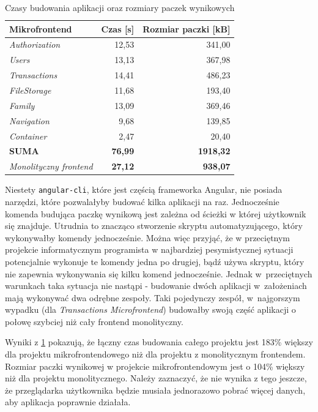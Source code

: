 \documentclass{SGGW-thesis}
\begin{document}
    \begin{table}[h]
      \centering
      \caption{Czasy budowania aplikacji oraz rozmiary paczek wynikowych}
      \begin{tabular}{|l||r|r|}
      \hline
      \textbf{Mikrofrontend} & \multicolumn{1}{l|}{\textbf{Czas {[}s{]}}} & \multicolumn{1}{l|}{\textbf{Rozmiar paczki {[}kB{]}}} \\ \hline
      \textit{Authorization} & 12,53 & 341,00 \\ \hline
      \textit{Users} & 13,13 & 367,98 \\ \hline
      \textit{Transactions} & 14,41 & 486,23 \\ \hline
      \textit{FileStorage} & 11,68 & 193,40 \\ \hline
      \textit{Family} & 13,09 & 369,46 \\ \hline
      \textit{Navigation} & 9,68 & 139,85 \\ \hline
      \textit{Container} & 2,47 & 20,40 \\ \hline
       \textbf{SUMA} & \textbf{76,99} & \textbf{1918,32} \\ \hline\hline
       \textit{Monolityczny frontend} & \textbf{27,12} & \textbf{938,07} \\ \hline
      \end{tabular}
      \label{table:build_times}
    \end{table}

    Niestety \lstinline{angular-cli}, które jest częścią frameworka Angular, nie posiada narzędzi, które pozwalałyby budować kilka aplikacji na raz. Jednocześnie komenda budująca paczkę wynikową jest zależna od ścieżki w której użytkownik się znajduje. Utrudnia to znacząco stworzenie skryptu automatyzującego, który wykonywałby komendy jednocześnie. Można więc przyjąć, że w przeciętnym projekcie informatycznym programista w najbardziej pesymistycznej sytuacji potencjalnie wykonuje te komendy jedna po drugiej, bądź używa skryptu, który nie zapewnia wykonywania się kilku komend jednocześnie. Jednak w~przeciętnych warunkach taka sytuacja nie nastąpi - budowanie dwóch aplikacji w~założeniach mają wykonywać dwa odrębne zespoły. Taki pojedynczy zespół, w~najgorszym wypadku (dla \textit{Transactions Microfrontend}) budowałby swoją część aplikacji o połowę szybciej niż cały frontend monolityczny.

    Wyniki z \cref{table:build_times} pokazują, że łączny czas budowania całego projektu jest 183\% większy dla projektu mikrofrontendowego niż dla projektu z monolitycznym frontendem. Rozmiar paczki wynikowej w projekcie mikrofrontendowym jest o 104\% większy niż dla projektu monolitycznego. Należy zaznaczyć, że nie wynika z tego jeszcze, że przeglądarka użytkownika będzie musiała jednorazowo pobrać więcej danych, aby aplikacja poprawnie działała.
\end{document}
